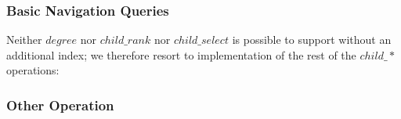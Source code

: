 \begin{algorithmic}
	\State {}
\EndFunction
\end{algorithmic}

\begin{algorithmic}
	\State {} 
\EndFunction
\end{algorithmic}

\subsubsection{Basic Navigation Queries}

\begin{algorithmic}
		\State {}
	\Else
		\State {}
	\EndIf
\EndFunction
\end{algorithmic}

Neither $degree$ nor $child\_rank$ nor $child\_select$ is possible to support without an additional index; we therefore resort to implementation of the rest of the $child\_*$ operations:

\begin{algorithmic}
		\State {}
	\Else
		\State {}
	\EndIf
\EndFunction
\end{algorithmic}

\begin{algorithmic}
		\State {}
	\Else
		\State {}
	\EndIf
\EndFunction
\end{algorithmic}

\begin{algorithmic}
		\State {}
	\Else
		\State {}
	\EndIf
\EndFunction
\end{algorithmic}

\begin{algorithmic}
		\State {}
	\Else
		\State {}
	\EndIf
\EndFunction
\end{algorithmic}

\subsubsection{Other Operation}

